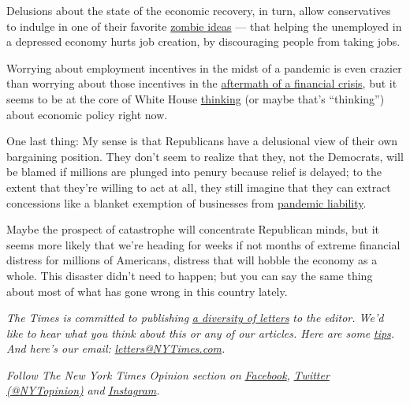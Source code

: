 Delusions about the state of the economic recovery, in turn, allow
conservatives to indulge in one of their favorite
\href{https://wwnorton.com/books/9781324005018}{zombie ideas} --- that
helping the unemployed in a depressed economy hurts job creation, by
discouraging people from taking jobs.

Worrying about employment incentives in the midst of a pandemic is even
crazier than worrying about those incentives in the
\href{https://www.nytimes3xbfgragh.onion/2010/07/05/opinion/05krugman.html}{aftermath
of a financial crisis}, but it seems to be at the core of White House
\href{https://twitter.com/paulkrugman/status/1282737752828764161}{thinking}
(or maybe that's ``thinking'') about economic policy right now.

One last thing: My sense is that Republicans have a delusional view of
their own bargaining position. They don't seem to realize that they, not
the Democrats, will be blamed if millions are plunged into penury
because relief is delayed; to the extent that they're willing to act at
all, they still imagine that they can extract concessions like a blanket
exemption of businesses from
\href{https://www.cnn.com/2020/07/13/politics/covid-aid-congress-mitch-mcconnell/index.html}{pandemic
liability}.

Maybe the prospect of catastrophe will concentrate Republican minds, but
it seems more likely that we're heading for weeks if not months of
extreme financial distress for millions of Americans, distress that will
hobble the economy as a whole. This disaster didn't need to happen; but
you can say the same thing about most of what has gone wrong in this
country lately.

\emph{The Times is committed to publishing}
\href{https://www.nytimes3xbfgragh.onion/2019/01/31/opinion/letters/letters-to-editor-new-york-times-women.html}{\emph{a
diversity of letters}} \emph{to the editor. We'd like to hear what you
think about this or any of our articles. Here are some}
\href{https://help.nytimes3xbfgragh.onion/hc/en-us/articles/115014925288-How-to-submit-a-letter-to-the-editor}{\emph{tips}}\emph{.
And here's our email:}
\href{mailto:letters@NYTimes.com}{\emph{letters@NYTimes.com}}\emph{.}

\emph{Follow The New York Times Opinion section on}
\href{https://www.facebookcorewwwi.onion/nytopinion}{\emph{Facebook}}\emph{,}
\href{http://twitter.com/NYTOpinion}{\emph{Twitter (@NYTopinion)}}
\emph{and}
\href{https://www.instagram.com/nytopinion/}{\emph{Instagram}}\emph{.}

